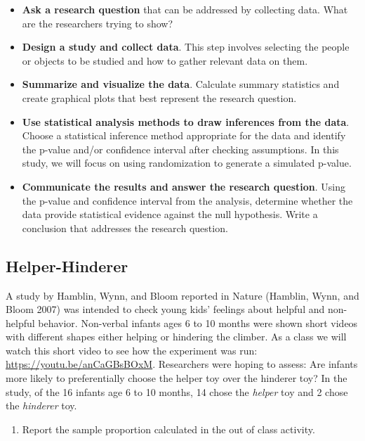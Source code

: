 \documentclass[
]{report}
\providecommand{\tightlist}{%
  \setlength{\itemsep}{0pt}\setlength{\parskip}{0pt}}
\begin{document}
\begin{itemize}
\item
  \textbf{Ask a research question} that can be addressed by collecting data. What are the researchers trying to show?
\item
  \textbf{Design a study and collect data}. This step involves selecting the people or objects to be studied and how to gather relevant data on them.
\item
  \textbf{Summarize and visualize the data}. Calculate summary statistics and create graphical plots that best represent the research question.
\item
  \textbf{Use statistical analysis methods to draw inferences from the data}. Choose a statistical inference method appropriate for the data and identify the p-value and/or confidence interval after checking assumptions. In this study, we will focus on using randomization to generate a simulated p-value.
\item
  \textbf{Communicate the results and answer the research question}. Using the p-value and confidence interval from the analysis, determine whether the data provide statistical evidence against the null hypothesis. Write a conclusion that addresses the research question.
\end{itemize}

\hypertarget{helper-hinderer-1}{%
\subsection{Helper-Hinderer}\label{helper-hinderer-1}}

A study by Hamblin, Wynn, and Bloom reported in Nature (Hamblin, Wynn, and Bloom 2007) was intended to check young kids' feelings about helpful and non-helpful behavior. Non-verbal infants ages 6 to 10 months were shown short videos with different shapes either helping or hindering the climber. As a class we will watch this short video to see how the experiment was run: \url{https://youtu.be/anCaGBsBOxM}. Researchers were hoping to assess: Are infants more likely to preferentially choose the helper toy over the hinderer toy? In the study, of the 16 infants age 6 to 10 months, 14 chose the \emph{helper} toy and 2 chose the \emph{hinderer} toy.

\begin{enumerate}
\def\labelenumi{\arabic{enumi}.}
\tightlist
\item
  Report the sample proportion calculated in the out of class activity.
\end{enumerate}
\end{document}
